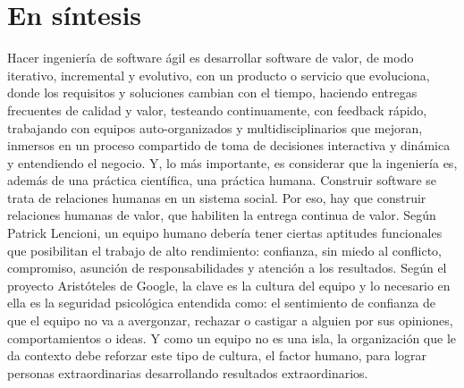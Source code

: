 \section{En síntesis}

Hacer ingeniería de software ágil es desarrollar software de valor, de modo iterativo, incremental y evolutivo, con un producto o servicio que evoluciona, donde los requisitos y soluciones cambian con el tiempo, haciendo entregas frecuentes de calidad y valor, testeando continuamente, con feedback rápido, trabajando con equipos auto-organizados y multidisciplinarios que mejoran, inmersos en un proceso compartido de toma de decisiones interactiva y dinámica y entendiendo el negocio. Y, lo más importante, es considerar que la ingeniería es, además de una práctica científica, una práctica humana. Construir software se trata de relaciones humanas en un sistema social. Por eso, hay que construir relaciones humanas de valor, que habiliten la entrega continua de valor. Según Patrick Lencioni, un equipo humano debería tener ciertas aptitudes funcionales que posibilitan el trabajo de alto rendimiento: confianza, sin miedo al conflicto, compromiso, asunción de responsabilidades y atención a los resultados. Según el proyecto Aristóteles de Google, la clave es la cultura del equipo y lo necesario en ella es la seguridad psicológica entendida como: el sentimiento de confianza de que el equipo no va a avergonzar, rechazar o castigar a alguien por sus opiniones, comportamientos o ideas. Y como un equipo no es una isla, la organización que le da contexto debe reforzar este tipo de cultura, el factor humano, para lograr personas extraordinarias desarrollando resultados extraordinarios.
